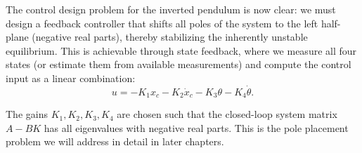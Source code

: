 The control design problem for the inverted pendulum is now clear: we must design a feedback controller that shifts all poles of the system to the left half-plane (negative real parts), thereby stabilizing the inherently unstable equilibrium. This is achievable through state feedback, where we measure all four states (or estimate them from available measurements) and compute the control input as a linear combination:
\begin{equation}
u = -K_1 x_c - K_2 \dot{x}_c - K_3 \theta - K_4 \dot{\theta}.
\end{equation}

The gains $K_1, K_2, K_3, K_4$ are chosen such that the closed-loop system matrix $A - BK$ has all eigenvalues with negative real parts. This is the pole placement problem we will address in detail in later chapters.

